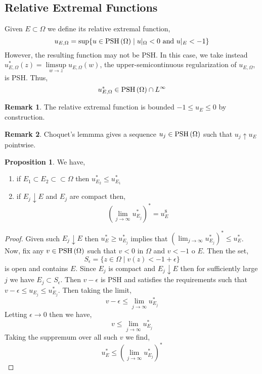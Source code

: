 \documentclass[12pt]{extarticle}
\theoremstyle{definition}
\newtheorem{proposition}[theorem]{Proposition}
\newtheorem{remark}{Remark}
\newenvironment{definition}[1][Definition:]{\begin{trivlist}
\item[\hskip \labelsep {\bfseries #1}]}{\end{trivlist}}
\begin{document}
\subsection{Relative Extremal Functions}

\begin{definition}
Given $E \subset \Omega$ we define its relative extremal function,
\[ u_{E, \Omega} = \sup \{ u \in \mathrm{PSH}\left( \Omega \right) \mid u|_\Omega < 0 \text{ and } u|_E < - 1\} \]
However, the resulting function may not be PSH. In this case, we take instead $u_{E,\Omega}^*(z) = \limsup\limits_{w \to z} u_{E, \Omega}(w)$, the upper-semicontinuous regularization of $u_{E, \Omega}$, is PSH. Thus,
\[ u_{E, \Omega}^* \in \mathrm{PSH}\left( \Omega \right) \cap L^\infty \] 
\end{definition}

\begin{remark}
The relative extremal function is bounded $-1 \le u_E \le 0$ by construction. 
\end{remark}

\begin{remark}
Choquet's lemmma gives a sequence $u_j \in \mathrm{PSH}\left( \Omega \right)$ such that $u_j \uparrow u_E$ pointwise.
\end{remark}

\begin{proposition}
We have,
\begin{enumerate}
\item if $E_1 \subset E_2 \subset \subset \Omega$ then $u_{E_2}^{*} \le u_{E_1}^*$
\item if $E_j \downarrow E$ and $E_j$ are compact then,
\[ \left( \lim_{j \to \infty} u_{E_j}^* \right)^* = u_E^8 \]
\end{enumerate}
\end{proposition}

\begin{proof}
Given such $E_j \downarrow E$ then $u_E^* \ge u_{E_j}^*$ implies that $\left( \lim_{j \to \infty} u^*_{E_j} \right)^* \le u_E^*$. Now, fix any $v \in \mathrm{PSH}\left( \Omega \right)$ such that $v < 0$ in $\Omega$ and $v < -1$ o $E$. Then the set,
\[ S_\epsilon = \{ z \in \Omega \mid v(z) < -1 + \epsilon \} \]
is open and contains $E$. Since $E_j$ is compact and $E_j \downarrow E$ then for sufficiently large $j$ we have $E_j \subset S_\epsilon$. Then $v - \epsilon$ is PSH and satisfies the requirements such that $v - \epsilon \le u_{E_j} \le u^*_{E_j}$. Then taking the limit,
\[ v - \epsilon \le \lim_{j \to \infty} u_{E_j}^* \]
Letting $\epsilon \to 0$ then we have,
\[ v \le \lim_{j \to \infty} u_{E_j}^* \]
Taking the suppremum over all such $v$ we find,
\[ u_E^* \le \left( \lim_{j \to \infty} u_{E_j}^* \right)^* \] 
\end{proof}
\end{document}
